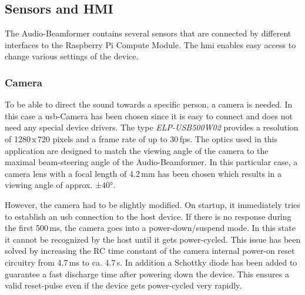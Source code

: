 \subsection{Sensors and HMI}
The Audio-Beamformer contains several sensors that are connected by different interfaces to the Raspberry Pi Compute Module. The \acrfull{hmi} enables easy access to change various settings of the device.

\subsubsection{Camera}
To be able to direct the sound towards a specific person, a camera is needed. In this case a \acrshort{usb}-Camera has been chosen since it is easy to connect and does not need any special device drivers. The type \textit{ELP-USB500W02} provides a resolution of 1280\,x\,720 pixels and a frame rate of up to 30\,\acrshort{fps}. The optics used in this application are designed to match the viewing angle of the camera to the maximal beam-steering angle of the Audio-Beamformer. In this particular case, a camera lens with a focal length of 4.2\,mm has been chosen which results in a viewing angle of approx. ±40°.

However, the camera had to be slightly modified. On startup, it immediately tries to establish an \acrshort{usb} connection to the host device. If there is no response during the first 500\,ms, the camera goes into a power-down/suspend mode. In this state it cannot be recognized by the host until it gets power-cycled. This issue has been solved by increasing the RC time constant of the camera internal power-on reset circuitry from 4.7\,ms to ca. 4.7\,s. In addition a Schottky diode has been added to guarantee a fast discharge time after powering down the device. This ensures a valid reset-pulse even if the device gets power-cycled very rapidly.

